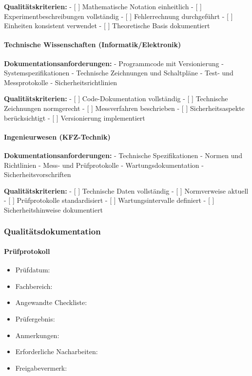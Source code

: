 \documentclass{vorlage-design-main}
\begin{document}
\textbf{Qualitätskriterien:} - {[} {]} Mathematische Notation
einheitlich - {[} {]} Experimentbeschreibungen vollständig - {[} {]}
Fehlerrechnung durchgeführt - {[} {]} Einheiten konsistent verwendet -
{[} {]} Theoretische Basis dokumentiert

\paragraph{Technische Wissenschaften
(Informatik/Elektronik)}\label{technische-wissenschaften-informatikelektronik}

\textbf{Dokumentationsanforderungen:} - Programmcode mit Versionierung -
Systemspezifikationen - Technische Zeichnungen und Schaltpläne - Test-
und Messprotokolle - Sicherheitsrichtlinien

\textbf{Qualitätskriterien:} - {[} {]} Code-Dokumentation vollständig -
{[} {]} Technische Zeichnungen normgerecht - {[} {]} Messverfahren
beschrieben - {[} {]} Sicherheitsaspekte berücksichtigt - {[} {]}
Versionierung implementiert

\paragraph{Ingenieurwesen
(KFZ-Technik)}\label{ingenieurwesen-kfz-technik}

\textbf{Dokumentationsanforderungen:} - Technische Spezifikationen -
Normen und Richtlinien - Mess- und Prüfprotokolle -
Wartungsdokumentation - Sicherheitsvorschriften

\textbf{Qualitätskriterien:} - {[} {]} Technische Daten vollständig -
{[} {]} Normverweise aktuell - {[} {]} Prüfprotokolle standardisiert -
{[} {]} Wartungsintervalle definiert - {[} {]} Sicherheitshinweise
dokumentiert

\subsubsection{Qualitätsdokumentation}\label{qualitaetsdokumentation}

\paragraph{Prüfprotokoll}\label{pruefprotokoll}

\begin{itemize}

\item
  Prüfdatum:
\item
  Fachbereich:
\item
  Angewandte Checkliste:
\item
  Prüfergebnis:
\item
  Anmerkungen:
\item
  Erforderliche Nacharbeiten:
\item
  Freigabevermerk:
\end{itemize}
\end{document}
